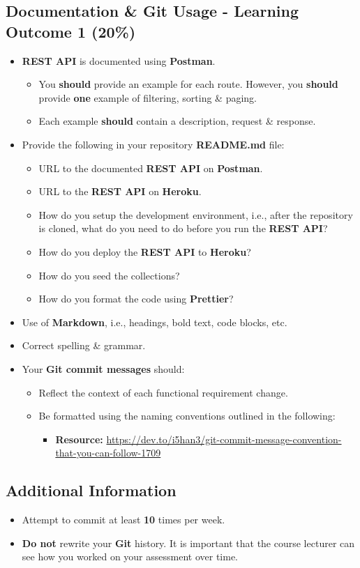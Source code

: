 \documentclass{article}
\begin{document}
\subsection*{Documentation \& Git Usage - Learning Outcome 1 (20\%)}
\begin{itemize}
	\item \textbf{REST API} is documented using \textbf{Postman}.
	\begin{itemize}
		\item You \textbf{should} provide an example for each route. However, you \textbf{should} provide \textbf{one} example of filtering, sorting \& paging. 
		\item Each example \textbf{should} contain a description, request \& response.
	\end{itemize}
	\item Provide the following in your repository \textbf{README.md} file:
	\begin{itemize}
		\item URL to the documented \textbf{REST API} on \textbf{Postman}.
		\item URL to the \textbf{REST API} on \textbf{Heroku}.
		\item How do you setup the development environment, i.e., after the repository is cloned, what do you need to do before you run the \textbf{REST API}?
		\item How do you deploy the \textbf{REST API} to \textbf{Heroku}?
		\item How do you seed the collections?
		\item How do you format the code using \textbf{Prettier}?
	\end{itemize}
	\item Use of \textbf{Markdown}, i.e., headings, bold text, code blocks, etc.
	\item Correct spelling \& grammar. 
	\item Your \textbf{Git commit messages} should:
	\begin{itemize}
		\item Reflect the context of each functional requirement change.
		\item Be formatted using the naming conventions outlined in the following:
			\begin{itemize}
				\item \textbf{Resource:} \small\href{https://dev.to/i5han3/git-commit-message-convention-that-you-can-follow-1709}{https://dev.to/i5han3/git-commit-message-convention-that-you-can-follow-1709}
			\end{itemize}
	\end{itemize}
\end{itemize}

\subsection*{Additional Information}
\begin{itemize}
    \item Attempt to commit at least \textbf{10} times per week.
    \item \textbf{Do not} rewrite your \textbf{Git} history. It is important that the course lecturer can see how you worked on your assessment over time. 
\end{itemize} 
\end{document}
